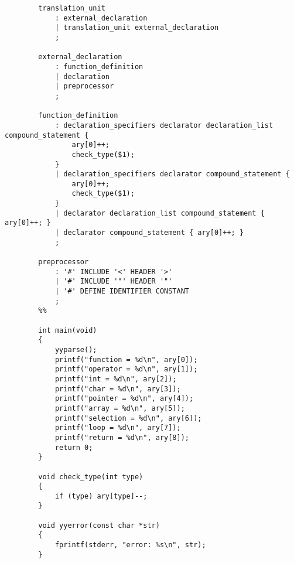 \documentclass{article}
\begin{document}
\begin{lstlisting}
		translation_unit
			: external_declaration
			| translation_unit external_declaration
			;
		
		external_declaration
			: function_definition
			| declaration
			| preprocessor
			;
		
		function_definition
			: declaration_specifiers declarator declaration_list compound_statement {
				ary[0]++;
				check_type($1);
			}
			| declaration_specifiers declarator compound_statement {
				ary[0]++;
				check_type($1);
			}
			| declarator declaration_list compound_statement { ary[0]++; }
			| declarator compound_statement	{ ary[0]++; }
			;
		
		preprocessor
			: '#' INCLUDE '<' HEADER '>'
			| '#' INCLUDE '"' HEADER '"'
			| '#' DEFINE IDENTIFIER CONSTANT
			;
		%%
		
		int main(void)
		{
			yyparse();
			printf("function = %d\n", ary[0]);
			printf("operator = %d\n", ary[1]);
			printf("int = %d\n", ary[2]);
			printf("char = %d\n", ary[3]);
			printf("pointer = %d\n", ary[4]);
			printf("array = %d\n", ary[5]);
			printf("selection = %d\n", ary[6]);
			printf("loop = %d\n", ary[7]);
			printf("return = %d\n", ary[8]);
			return 0;
		}
		
		void check_type(int type)
		{
			if (type) ary[type]--;
		}
		
		void yyerror(const char *str)
		{
			fprintf(stderr, "error: %s\n", str);
		}
\end{lstlisting}
\end{document}
